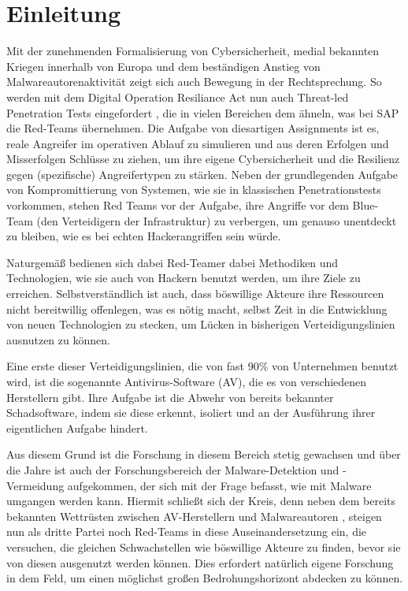 \chapter{Einleitung}
Mit der zunehmenden Formalisierung von Cybersicherheit, medial bekannten Kriegen innerhalb von Europa und dem beständigen Anstieg von Malwareautorenaktivität zeigt sich auch Bewegung in der Rechtsprechung. So werden mit dem Digital Operation Resiliance Act  nun auch Threat-led Penetration Tests eingefordert \cite{ab_2024_tlpt, Europaeisches Parlement}, die in vielen Bereichen dem ähneln, was bei SAP die Red-Teams übernehmen. Die Aufgabe von diesartigen Assignments ist es, reale Angreifer im operativen Ablauf zu simulieren und aus deren Erfolgen und Misserfolgen Schlüsse zu ziehen, um ihre eigene Cybersicherheit und die Resilienz gegen (spezifische) Angreifertypen zu stärken.
Neben der grundlegenden Aufgabe von Kompromittierung von Systemen, wie sie in klassischen Penetrationstests vorkommen, stehen Red Teams vor der Aufgabe, ihre Angriffe vor dem Blue-Team (den Verteidigern der Infrastruktur) zu verbergen, um genauso unentdeckt zu bleiben, wie es bei echten Hackerangriffen sein würde.

Naturgemäß bedienen sich dabei Red-Teamer dabei Methodiken und Technologien, wie sie auch von Hackern benutzt werden, um ihre Ziele zu erreichen. Selbstverständlich ist auch, dass böswillige Akteure ihre Ressourcen nicht bereitwillig offenlegen, was es nötig macht, selbst Zeit in die Entwicklung von neuen Technologien zu stecken, um Lücken in bisherigen Verteidigungslinien ausnutzen zu können.

 Eine erste dieser Verteidigungslinien, die von fast 90\% \cite{dey_2024_antivirus} von Unternehmen benutzt wird, ist die sogenannte Antivirus-Software (AV), die es von verschiedenen Herstellern gibt. Ihre Aufgabe ist die Abwehr von bereits bekannter Schadsoftware, indem sie diese erkennt, isoliert und an der Ausführung ihrer eigentlichen Aufgabe hindert.

Aus diesem Grund ist die Forschung in diesem Bereich stetig gewachsen und über die Jahre ist auch der Forschungsbereich der Malware-Detektion und -Vermeidung aufgekommen, der sich mit der Frage befasst, wie mit Malware umgangen werden kann. Hiermit schließt sich der Kreis, denn neben dem bereits bekannten Wettrüsten zwischen AV-Herstellern und Malwareautoren \cite{alejandro_2024_a}, steigen nun als dritte Partei noch Red-Teams in diese Auseinandersetzung ein, die versuchen, die gleichen Schwachstellen wie böswillige Akteure zu finden, bevor sie von diesen ausgenutzt werden können. Dies erfordert natürlich eigene Forschung in dem Feld, um einen möglichst großen Bedrohungshorizont abdecken zu können.

